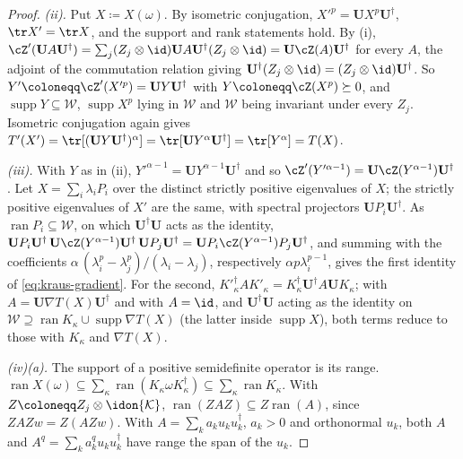 \begin{proof}
\emph{(ii).} Put $X\coloneqq X(\omega)$. By isometric conjugation,
$X'^{p}=\mathbf UX^{p}\mathbf U^{\dagger}$, $\tr X'=\tr X$, and the support
and rank statements hold. By (i),
$\cZ'(\mathbf UA\mathbf U^{\dagger})=\sum_j(Z_j\otimes\id)\mathbf UA
\mathbf U^{\dagger}(Z_j\otimes\id)=\mathbf U\cZ(A)\mathbf U^{\dagger}$ for
every $A$, the adjoint of the commutation relation giving
$\mathbf U^{\dagger}(Z_j\otimes\id)=(Z_j\otimes\id)\mathbf U^{\dagger}$.
So $Y'\coloneqq\cZ'(X'^{p})=\mathbf UY\mathbf U^{\dagger}$ with
$Y\coloneqq\cZ(X^{p})\succeq0$, and $\operatorname{supp}Y\subseteq\mathcal{W}$,
$\operatorname{supp}X^{p}$ lying in $\mathcal{W}$ and $\mathcal{W}$ being
invariant under every $Z_j$. Isometric conjugation again gives
$T'(X')=\tr[(\mathbf UY\mathbf U^{\dagger})^{\alpha}]
=\tr[\mathbf UY^{\alpha}\mathbf U^{\dagger}]=\tr[Y^{\alpha}]=T(X)$.

\emph{(iii).} With $Y$ as in (ii), $Y'^{\alpha-1}=\mathbf UY^{\alpha-1}
\mathbf U^{\dagger}$ and so $\cZ'(Y'^{\alpha-1})=\mathbf U\cZ(Y^{\alpha-1})
\mathbf U^{\dagger}$. Let $X=\sum_i\lambda_iP_i$ over the distinct strictly
positive eigenvalues of $X$; the strictly positive eigenvalues of $X'$ are the
same, with spectral projectors $\mathbf UP_i\mathbf U^{\dagger}$. As
$\operatorname{ran}P_i\subseteq\mathcal{W}$, on which
$\mathbf U^{\dagger}\mathbf U$ acts as the identity,
$\mathbf UP_i\mathbf U^{\dagger}\,\mathbf U\cZ(Y^{\alpha-1})\mathbf U^{\dagger}
\,\mathbf UP_j\mathbf U^{\dagger}=\mathbf UP_i\cZ(Y^{\alpha-1})P_j
\mathbf U^{\dagger}$, and summing with the coefficients
$\alpha\,(\lambda_i^{p}-\lambda_j^{p})/(\lambda_i-\lambda_j)$, respectively
$\alpha p\lambda_i^{p-1}$, gives the first identity of
\eqref{eq:kraus-gradient}. For the second,
$K'^{\dagger}_{\kappa}AK'_{\kappa}=K_{\kappa}^{\dagger}\mathbf U^{\dagger}A
\mathbf UK_{\kappa}$; with $A=\mathbf U\nabla T(X)\mathbf U^{\dagger}$ and
with $A=\id$, and $\mathbf U^{\dagger}\mathbf U$ acting as the identity on
$\mathcal{W}\supseteq\operatorname{ran}K_{\kappa}\cup\operatorname{supp}\nabla T(X)$
(the latter inside $\operatorname{supp}X$), both terms reduce to those with
$K_{\kappa}$ and $\nabla T(X)$.

\emph{(iv)(a).} The support of a positive semidefinite operator is its
range. $\operatorname{ran}X(\omega)\subseteq\sum_{\kappa}
\operatorname{ran}(K_{\kappa}\omega K_{\kappa}^{\dagger})\subseteq
\sum_{\kappa}\operatorname{ran}K_{\kappa}$. With
$Z\coloneqq Z_j\otimes\idon{\mathcal{K}}$, $\operatorname{ran}(ZAZ)\subseteq
Z\operatorname{ran}(A)$, since $ZAZw=Z(AZw)$. With
$A=\sum_ka_ku_ku_k^{\dagger}$, $a_k>0$ and orthonormal $u_k$, both $A$ and
$A^{q}=\sum_ka_k^{q}u_ku_k^{\dagger}$ have range the span of the $u_k$.


\end{proof}
